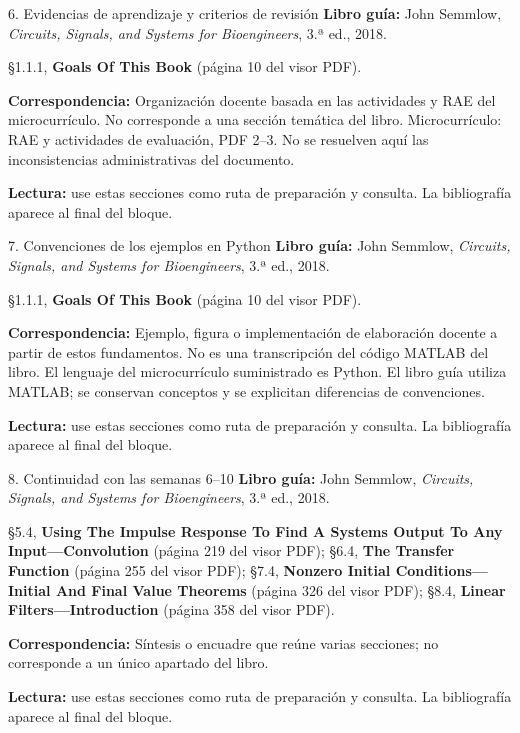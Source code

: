 \documentclass[
  10pt,
  ignorenonframetext,
  aspectratio=169,
  spanish,
]{beamer}
\begin{document}
\begin{frame}{6. Evidencias de aprendizaje y criterios de revisión}
\label{evidencias-de-aprendizaje-y-criterios-de-revisiuxf3n-2}
\textbf{Libro guía:} John Semmlow, \emph{Circuits, Signals, and Systems
for Bioengineers}, 3.ª ed., 2018.

§1.1.1, \textbf{Goals Of This Book} (página 10 del visor PDF).

\textbf{Correspondencia:} Organización docente basada en las actividades
y RAE del microcurrículo. No corresponde a una sección temática del
libro. Microcurrículo: RAE y actividades de evaluación, PDF 2--3. No se
resuelven aquí las inconsistencias administrativas del documento.

\textbf{Lectura:} use estas secciones como ruta de preparación y
consulta. La bibliografía aparece al final del bloque.
\end{frame}

\begin{frame}{7. Convenciones de los ejemplos en Python}
\label{convenciones-de-los-ejemplos-en-python-2}
\textbf{Libro guía:} John Semmlow, \emph{Circuits, Signals, and Systems
for Bioengineers}, 3.ª ed., 2018.

§1.1.1, \textbf{Goals Of This Book} (página 10 del visor PDF).

\textbf{Correspondencia:} Ejemplo, figura o implementación de
elaboración docente a partir de estos fundamentos. No es una
transcripción del código MATLAB del libro. El lenguaje del
microcurrículo suministrado es Python. El libro guía utiliza MATLAB; se
conservan conceptos y se explicitan diferencias de convenciones.

\textbf{Lectura:} use estas secciones como ruta de preparación y
consulta. La bibliografía aparece al final del bloque.
\end{frame}

\begin{frame}{8. Continuidad con las semanas 6--10}
\label{continuidad-con-las-semanas-610}
\textbf{Libro guía:} John Semmlow, \emph{Circuits, Signals, and Systems
for Bioengineers}, 3.ª ed., 2018.

§5.4, \textbf{Using The Impulse Response To Find A Systems Output To Any
Input---Convolution} (página 219 del visor PDF); §6.4, \textbf{The
Transfer Function} (página 255 del visor PDF); §7.4, \textbf{Nonzero
Initial Conditions---Initial And Final Value Theorems} (página 326 del
visor PDF); §8.4, \textbf{Linear Filters---Introduction} (página 358 del
visor PDF).

\textbf{Correspondencia:} Síntesis o encuadre que reúne varias
secciones; no corresponde a un único apartado del libro.

\textbf{Lectura:} use estas secciones como ruta de preparación y
consulta. La bibliografía aparece al final del bloque.
\end{frame}
\end{document}
